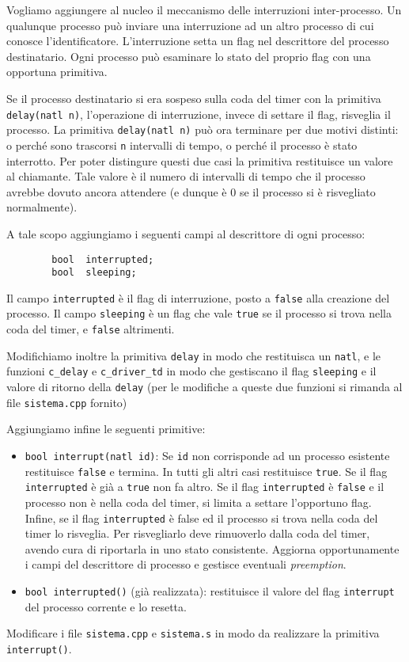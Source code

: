 Vogliamo aggiungere al nucleo il meccanismo delle interruzioni inter-processo.
Un qualunque processo pu\`o inviare una interruzione ad un altro processo di cui conosce l'identificatore.
L'interruzione setta un flag nel descrittore del processo destinatario. Ogni processo pu\`o esaminare
lo stato del proprio flag con una opportuna primitiva.

Se il processo destinatario si era sospeso sulla coda del timer con la primitiva \verb|delay(natl n)|,
l'operazione di interruzione, invece di settare il flag, risveglia il processo. La primitiva
\verb|delay(natl n)| pu\`o ora terminare per due motivi distinti: o perch\'e sono trascorsi \verb|n|
intervalli di tempo, o perch\'e il processo \`e stato interrotto. Per poter distingure questi due casi
la primitiva restituisce un valore al chiamante. Tale valore \`e il numero di intervalli di tempo
che il processo avrebbe dovuto ancora attendere (e dunque \`e 0 se il
processo si \`e risvegliato normalmente).

A tale scopo aggiungiamo i seguenti campi al descrittore di ogni processo:
\begin{verbatim}
        bool  interrupted;
        bool  sleeping;
\end{verbatim}
Il campo \verb|interrupted| \`e il flag di interruzione, posto a \verb|false| alla creazione del processo.
Il campo \verb|sleeping| \`e un flag che vale \verb|true| se il processo si trova nella coda del timer,
e \verb|false| altrimenti.

Modifichiamo inoltre la primitiva \verb|delay| in modo che restituisca un \verb|natl|,
e le funzioni \verb|c_delay| e \verb|c_driver_td| in modo che gestiscano
il flag \verb|sleeping| e il valore di ritorno della \verb|delay|
(per le modifiche a queste due funzioni si rimanda al file \verb|sistema.cpp| fornito)

Aggiungiamo infine le seguenti primitive:
\begin{itemize}
\item \verb|bool interrupt(natl id)|:
  Se \verb|id| non corrisponde ad un processo esistente restituisce \verb|false| e termina.
  In tutti gli altri casi restituisce \verb|true|.
  Se il flag \verb|interrupted| \`e gi\`a a \verb|true| non fa altro.
  Se il flag \verb|interrupted| \`e \verb|false| e il processo non \`e nella coda del timer, si limita a settare
  l'opportuno flag.
  Infine, se il flag \verb|interrupted| \`e false ed il processo si trova nella coda del timer
  lo risveglia. Per risvegliarlo deve rimuoverlo dalla coda del timer, avendo cura
  di riportarla in uno stato consistente.
  Aggiorna opportunamente i campi del descrittore di processo 
  e gestisce eventuali {\em preemption}.
\item \verb|bool interrupted()| (gi\`a realizzata):
  restituisce il valore del flag \verb|interrupt| del processo corrente e lo resetta.
\end{itemize}

Modificare i file \verb|sistema.cpp| e \verb|sistema.s| in modo da
realizzare la primitiva \verb|interrupt()|.
